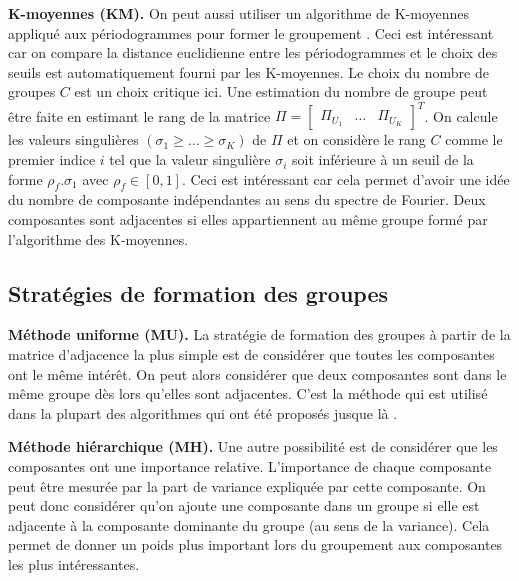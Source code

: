 \documentclass{gretsi}
\newcommand{\val}[3]{(#1_1 #3 \dots #3 #1_#2)}
\newcommand{\inter}{\left[0, 1\right]}
\begin{document}
\noindent\textbf{K-moyennes (KM).}\label{par:KM} 
    On peut aussi utiliser un algorithme de K-moyennes appliqué aux périodogrammes pour former le groupement \cite{alvarez_13_auto}.
    Ceci est intéressant car on compare la distance euclidienne entre les périodogrammes et le choix des seuils est automatiquement fourni par les K-moyennes.
    Le choix du nombre de groupes $C$ est un choix critique ici.
    Une estimation du nombre de groupe peut être faite en estimant le rang de la matrice $\Pi = \begin{bmatrix}\Pi_{U_1}&\dots&\Pi_{U_K}\end{bmatrix}^T$.
    On calcule les valeurs singulières $\val{\sigma}{K}{\ge}$ de $\Pi$ et on considère le rang $C$ comme le premier indice $i$ tel que la valeur singulière $\sigma_i$  soit inférieure à un seuil de la forme $\rho_f.\sigma_1$ avec $\rho_f \in \inter$.
    Ceci est intéressant car cela permet d'avoir une idée du nombre de composante indépendantes au sens du spectre de Fourier.
    Deux composantes sont adjacentes si elles appartiennent au même groupe formé par l'algorithme des K-moyennes.

\vspace{-.2cm}
\subsection{Stratégies de formation des groupes}
\label{sub:clust}
\vspace{-.1cm}
\begin{sloppypar}
\noindent\textbf{Méthode uniforme (MU).}
    La stratégie de formation des groupes à partir de la matrice d'adjacence la plus simple est de considérer que toutes les composantes ont le même intérêt.
    On peut alors considérer que deux composantes sont dans le même groupe dès lors qu'elles sont adjacentes.
    C'est la méthode qui est utilisé dans la plupart des algorithmes qui ont été proposés jusque là \cite{abalov_14_auto, alvarez_13_auto}.
\end{sloppypar}


\begin{sloppypar}
\noindent\textbf{Méthode hiérarchique (MH).}
    Une autre possibilité est de considérer que les composantes ont une importance relative.
    L'importance de chaque composante peut être mesurée par la part de variance expliquée par cette composante.
    On peut donc considérer qu'on ajoute une composante dans un groupe si elle est adjacente à la composante dominante du groupe (au sens de la variance).
    Cela permet de donner un poids plus important lors du groupement aux composantes les plus intéressantes.
\end{sloppypar}
\vspace{-.2cm}
\end{document}
